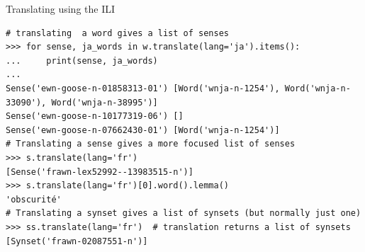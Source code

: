 \documentclass[aspectratio=169]{beamer}
\begin{document}
\begin{frame}[fragile]{Translating using the ILI}

\begin{verbatim}
# translating  a word gives a list of senses
>>> for sense, ja_words in w.translate(lang='ja').items():  
...     print(sense, ja_words)
...
Sense('ewn-goose-n-01858313-01') [Word('wnja-n-1254'), Word('wnja-n-33090'), Word('wnja-n-38995')]
Sense('ewn-goose-n-10177319-06') []
Sense('ewn-goose-n-07662430-01') [Word('wnja-n-1254')]
# Translating a sense gives a more focused list of senses
>>> s.translate(lang='fr') 
[Sense('frawn-lex52992--13983515-n')]
>>> s.translate(lang='fr')[0].word().lemma()
'obscurité'
# Translating a synset gives a list of synsets (but normally just one)
>>> ss.translate(lang='fr')  # translation returns a list of synsets
[Synset('frawn-02087551-n')]
\end{verbatim}
\end{frame}





\end{document}
